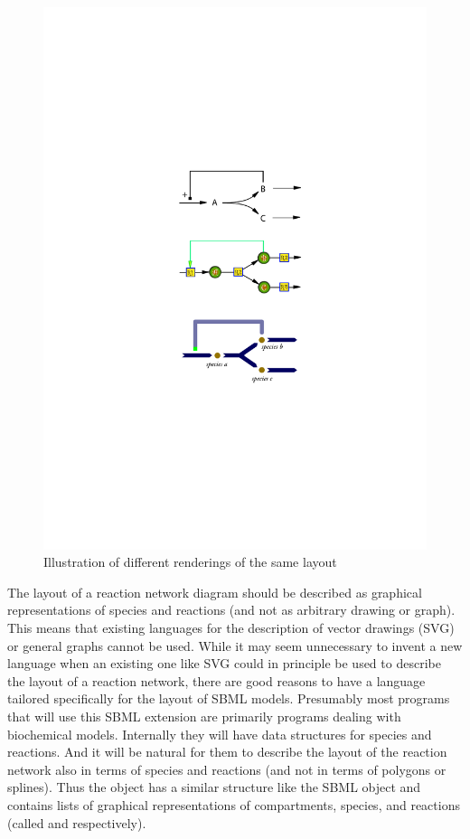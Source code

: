 \begin{center}
\begin{figure}[!h]
\begin{center}
\includegraphics[scale=1]{figures/layout1}
\end{center}
\caption{Illustration of different renderings of the same layout}
\label{UML:All}
\label{figure:rendering}
\end{figure}
\end{center}

The layout of a reaction network diagram should be described as graphical representations of species and reactions (and not as arbitrary drawing or graph). This means that existing languages for the description of vector drawings (SVG) or general graphs cannot be used. While it may seem unnecessary to invent a new language when an existing one like SVG could in principle be used to describe the layout of a reaction network, there are good reasons to have a language tailored specifically for the layout of SBML models.  
Presumably most programs that will use this SBML extension are primarily programs dealing with biochemical models. Internally they will have data structures for species and reactions. And it will be natural for them to describe the layout of the reaction network also in terms of species and reactions (and not in terms of polygons or splines). Thus the  object has a similar structure like the SBML  object and contains lists of graphical representations of compartments, species, and reactions (called  and  respectively). 

